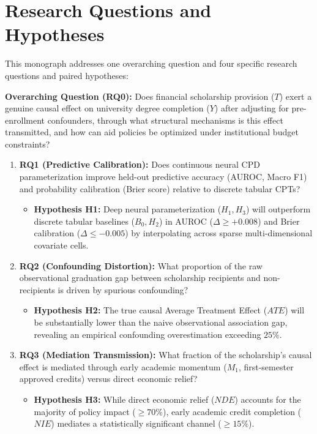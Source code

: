 \section{Research Questions and Hypotheses}

This monograph addresses one overarching question and four specific research questions and paired hypotheses:

\noindent\textbf{Overarching Question (RQ0):} Does financial scholarship provision ($T$) exert a genuine causal effect on university degree completion ($Y$) after adjusting for pre-enrollment confounders, through what structural mechanisms is this effect transmitted, and how can aid policies be optimized under institutional budget constraints?

\begin{enumerate}[leftmargin=*]
    \item \textbf{RQ1 (Predictive Calibration):} Does continuous neural CPD parameterization improve held-out predictive accuracy (AUROC, Macro F1) and probability calibration (Brier score) relative to discrete tabular CPTs?
    \begin{itemize}
        \item \textbf{Hypothesis H1:} Deep neural parameterization ($H_1, H_3$) will outperform discrete tabular baselines ($B_0, H_2$) in AUROC ($\Delta \ge +0.008$) and Brier calibration ($\Delta \le -0.005$) by interpolating across sparse multi-dimensional covariate cells.
    \end{itemize}

    \item \textbf{RQ2 (Confounding Distortion):} What proportion of the raw observational graduation gap between scholarship recipients and non-recipients is driven by spurious confounding?
    \begin{itemize}
        \item \textbf{Hypothesis H2:} The true causal Average Treatment Effect ($ATE$) will be substantially lower than the naive observational association gap, revealing an empirical confounding overestimation exceeding $25\%$.
    \end{itemize}

    \item \textbf{RQ3 (Mediation Transmission):} What fraction of the scholarship's causal effect is mediated through early academic momentum ($M_1$, first-semester approved credits) versus direct economic relief?
    \begin{itemize}
        \item \textbf{Hypothesis H3:} While direct economic relief ($NDE$) accounts for the majority of policy impact ($\ge 70\%$), early academic credit completion ($NIE$) mediates a statistically significant channel ($\ge 15\%$).
    \end{itemize}


\end{enumerate}
